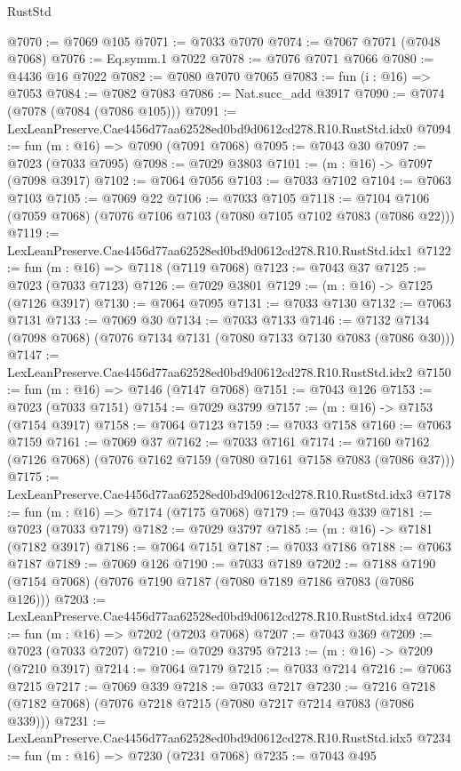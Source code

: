 \begin{lexlean}{RustStd}
\begin{coremodule}
@7070 := @7069 @105
@7071 := @7033 @7070
@7074 := @7067 @7071 (@7048 @7068)
@7076 := Eq.symm.{1} @7022
@7078 := @7076 @7071 @7066
@7080 := @4436 @16 @7022
@7082 := @7080 @7070 @7065
@7083 := fun (i : @16) => @7053
@7084 := @7082 @7083
@7086 := Nat.succ_add @3917
@7090 := @7074 (@7078 (@7084 (@7086 @105)))
@7091 := LexLeanPreserve.Cae4456d77aa62528ed0bd9d0612cd278.R10.RustStd.idx0
@7094 := fun (m : @16) => @7090 (@7091 @7068)
@7095 := @7043 @30
@7097 := @7023 (@7033 @7095)
@7098 := @7029 @3803
@7101 := (m : @16) -> @7097 (@7098 @3917)
@7102 := @7064 @7056
@7103 := @7033 @7102
@7104 := @7063 @7103
@7105 := @7069 @22
@7106 := @7033 @7105
@7118 := @7104 @7106 (@7059 @7068) (@7076 @7106 @7103 (@7080 @7105 @7102 @7083 (@7086 @22)))
@7119 := LexLeanPreserve.Cae4456d77aa62528ed0bd9d0612cd278.R10.RustStd.idx1
@7122 := fun (m : @16) => @7118 (@7119 @7068)
@7123 := @7043 @37
@7125 := @7023 (@7033 @7123)
@7126 := @7029 @3801
@7129 := (m : @16) -> @7125 (@7126 @3917)
@7130 := @7064 @7095
@7131 := @7033 @7130
@7132 := @7063 @7131
@7133 := @7069 @30
@7134 := @7033 @7133
@7146 := @7132 @7134 (@7098 @7068) (@7076 @7134 @7131 (@7080 @7133 @7130 @7083 (@7086 @30)))
@7147 := LexLeanPreserve.Cae4456d77aa62528ed0bd9d0612cd278.R10.RustStd.idx2
@7150 := fun (m : @16) => @7146 (@7147 @7068)
@7151 := @7043 @126
@7153 := @7023 (@7033 @7151)
@7154 := @7029 @3799
@7157 := (m : @16) -> @7153 (@7154 @3917)
@7158 := @7064 @7123
@7159 := @7033 @7158
@7160 := @7063 @7159
@7161 := @7069 @37
@7162 := @7033 @7161
@7174 := @7160 @7162 (@7126 @7068) (@7076 @7162 @7159 (@7080 @7161 @7158 @7083 (@7086 @37)))
@7175 := LexLeanPreserve.Cae4456d77aa62528ed0bd9d0612cd278.R10.RustStd.idx3
@7178 := fun (m : @16) => @7174 (@7175 @7068)
@7179 := @7043 @339
@7181 := @7023 (@7033 @7179)
@7182 := @7029 @3797
@7185 := (m : @16) -> @7181 (@7182 @3917)
@7186 := @7064 @7151
@7187 := @7033 @7186
@7188 := @7063 @7187
@7189 := @7069 @126
@7190 := @7033 @7189
@7202 := @7188 @7190 (@7154 @7068) (@7076 @7190 @7187 (@7080 @7189 @7186 @7083 (@7086 @126)))
@7203 := LexLeanPreserve.Cae4456d77aa62528ed0bd9d0612cd278.R10.RustStd.idx4
@7206 := fun (m : @16) => @7202 (@7203 @7068)
@7207 := @7043 @369
@7209 := @7023 (@7033 @7207)
@7210 := @7029 @3795
@7213 := (m : @16) -> @7209 (@7210 @3917)
@7214 := @7064 @7179
@7215 := @7033 @7214
@7216 := @7063 @7215
@7217 := @7069 @339
@7218 := @7033 @7217
@7230 := @7216 @7218 (@7182 @7068) (@7076 @7218 @7215 (@7080 @7217 @7214 @7083 (@7086 @339)))
@7231 := LexLeanPreserve.Cae4456d77aa62528ed0bd9d0612cd278.R10.RustStd.idx5
@7234 := fun (m : @16) => @7230 (@7231 @7068)
@7235 := @7043 @495

\end{coremodule}
\end{lexlean}

